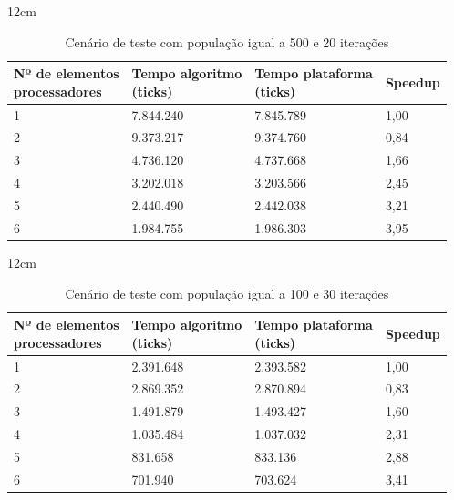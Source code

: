 \begin{table}[h]{12cm}
    \caption{Cenário de teste com população igual a 500 e 20 iterações}
    \label{tbl:taylor-vortex-parameters}
    \begin{tabular}{llll}
        \hline
        \shortstack[l]{Nº de elementos \\ processadores} & \shortstack[l]{Tempo algoritmo \\ (ticks)} & \shortstack[l]{Tempo plataforma \\ (ticks)} & Speedup \\
        \hline
        1 & 7.844.240 & 7.845.789 & 1,00 \\
        2 & 9.373.217 & 9.374.760 & 0,84 \\
        3 & 4.736.120 & 4.737.668 &	1,66 \\
        4 & 3.202.018 & 3.203.566 & 2,45 \\
        5 & 2.440.490 & 2.442.038 & 3,21 \\
        6 & 1.984.755 & 1.986.303 & 3,95 \\
        \hline
    \end{tabular}
\end{table}


\begin{table}[h]{12cm}
    \caption{Cenário de teste com população igual a 100 e 30 iterações}
    \label{tbl:taylor-vortex-parameters}
    \begin{tabular}{llll}
        \hline
        \shortstack[l]{Nº de elementos \\ processadores} & \shortstack[l]{Tempo algoritmo \\ (ticks)} & \shortstack[l]{Tempo plataforma \\ (ticks)} & Speedup \\
        \hline
        1 & 2.391.648 & 2.393.582 & 1,00 \\
        2 & 2.869.352 & 2.870.894 & 0,83 \\
        3 & 1.491.879 & 1.493.427 &	1,60 \\
        4 & 1.035.484 & 1.037.032 & 2,31 \\
        5 & 831.658   & 833.136   & 2,88 \\
        6 & 701.940   & 703.624   & 3,41 \\
        \hline
    \end{tabular}
\end{table}


